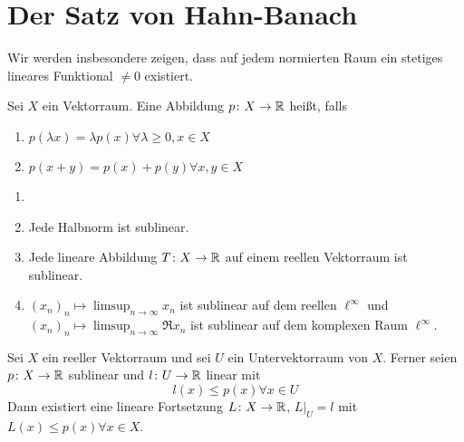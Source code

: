 \chapter{Der Satz von Hahn-Banach}
Wir werden insbesondere zeigen, dass auf jedem normierten Raum ein stetiges lineares Funktional $ \neq 0 $ existiert.
\begin{definition}
	Sei $ X $ ein Vektorraum. Eine Abbildung $ p\colon X\rightarrow\mathbb{R} $ hei\ss t, falls
	\begin{enumerate}
		\item $ p(\lambda x)=\lambda p(x)\forall\lambda\geq 0, x\in X $
		\item $ p(x+y)=p(x)+p(y)\forall x,y\in X $
	\end{enumerate}
\end{definition}
\begin{beispiel*}
	\begin{enumerate}
		\item[]
		\item Jede Halbnorm ist sublinear.
		\item Jede lineare Abbildung $ T\colon X\rightarrow\mathbb{R} $ auf einem reellen Vektorraum ist sublinear.
		\item $ (x_n)_n\mapsto \limsup_{n\to\infty} x_n$ ist sublinear auf dem reellen $ \ell^\infty $ und $ (x_n)_n\mapsto\limsup_{n\to\infty} \Re x_n $ ist sublinear auf dem komplexen Raum $ \ell^\infty $.
	\end{enumerate}
\end{beispiel*}
\begin{satz}
	Sei $ X $ ein reeller Vektorraum und sei $ U $ ein Untervektorraum von $ X $. Ferner seien $ p\colon X\rightarrow\mathbb{R} $ sublinear und $ l\colon U\rightarrow \mathbb{R} $ linear mit
	\[ l(x)\leq p(x)\forall x\in U \]
	Dann existiert eine lineare Fortsetzung $ L\colon X\rightarrow\mathbb{R} $, $ L|_U=l $ mit $ L(x)\leq p(x)\forall x\in X $.
\end{satz}
